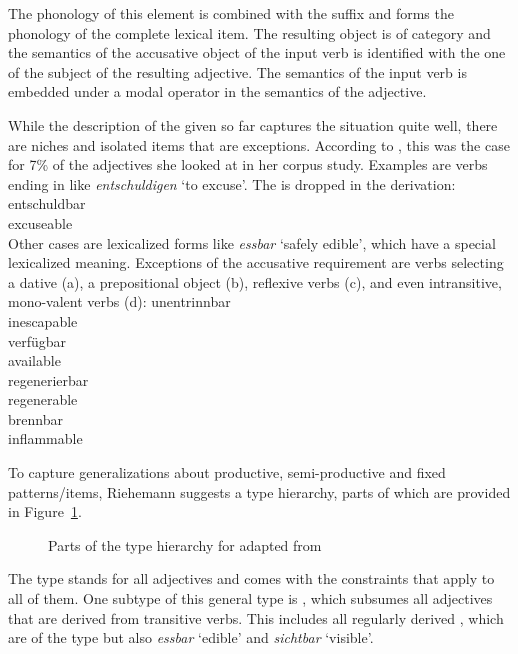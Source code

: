 \documentclass[output=paper
	        ,collection
	        ,collectionchapter
 	        ,biblatex
                ,babelshorthands
                ,newtxmath
                ,draftmode
                ,colorlinks, citecolor=brown
]{langscibook}
\begin{document}
The phonology of this element  is combined with the suffix  and forms the
phonology of the complete lexical item. The resulting object is of category  and the
semantics of the accusative object of the input verb  is identified with the one of the subject of the resulting adjective. The semantics of the
input verb  is embedded under a modal operator in the semantics of the adjective. 

While the description of the \bard given so far captures
the situation quite well, there are niches and isolated items that are exceptions. According to
\citet[]{Riehemann98a}, this was the case for 7\% of the adjectives she looked at in her
corpus study. Examples are verbs ending in  like \emph{entschuldigen} `to excuse'. The
 is dropped in the derivation:
\ea
\gll entschuldbar\\
     excuseable\\
\z
Other cases are lexicalized forms like \emph{essbar} `safely edible', which have a special
lexicalized meaning. Exceptions of the accusative requirement are verbs selecting a dative
(a), a prepositional object (b), reflexive verbs (c), and even intransitive, mono-valent verbs (d):
\eal
\ex 
\gll unentrinnbar\\
     inescapable\\
\ex 
\gll verfügbar\\
     available\\
\ex
\gll regenerierbar\\
     regenerable\\
\ex 
\gll brennbar\\
     inflammable\\
\zl 

To capture generalizations about productive, semi-productive and fixed patterns/items, Riehemann
suggests a type hierarchy, parts of which are provided in
Figure~\ref{fig-bar-Riehemann}.
\begin{figure}
\centerfit{%
\begin{forest}
type hierarchy
[bar-adj
  [trans-bar-adj
    [reg-bar-adj]
    [essbar]
    [\ldots]]
  [dative-bar-adj
    [unentrinnbar]
    [\ldots]]
  [prep-bar-adj
    [verfügbar]]
  [intr-bar-adj
    [brennbar]
    [\ldots]]]
\end{forest}}
\caption{\label{fig-bar-Riehemann}Parts of the type hierarchy for \bard adapted from }
\end{figure}
The type  stands for all  adjectives and comes with the constraints that
apply to all of them. One subtype of this general type is , which subsumes all
adjectives that are derived from transitive verbs. This includes all regularly derived \baradjs,
which are of the type  but also \emph{essbar} `edible' and \emph{sichtbar} `visible'.
\end{document}

